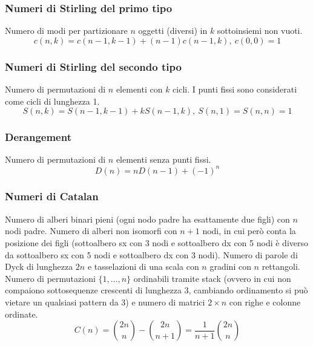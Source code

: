 \subsubsection{Numeri di Stirling del primo tipo}
Numero di modi per partizionare $n$ oggetti (diversi) in $k$ sottoinsiemi non vuoti.
$$ c(n,k) = c(n-1,k-1) + (n-1) c(n-1,k),\ c(0,0) = 1 $$

\subsubsection{Numeri di Stirling del secondo tipo}
Numero di permutazioni di $n$ elementi con $k$ cicli. I punti fissi sono considerati come cicli di lunghezza 1.
$$ S(n,k) = S(n-1,k-1) + k S(n-1,k),\ S(n,1) = S(n,n) = 1 $$

\subsubsection{Derangement}
Numero di permutazioni di $n$ elementi senza punti fissi.
$$ D(n)=nD(n-1)+(-1)^n $$

\subsubsection{Numeri di Catalan}
Numero di alberi binari pieni (ogni nodo padre ha esattamente due figli) con $n$ nodi padre.
Numero di alberi non isomorfi con $n+1$ nodi, in cui però conta la posizione dei figli (sottoalbero sx con 3 nodi e sottoalbero dx con 5 nodi è diverso da sottoalbero sx con 5 nodi e sottoalbero dx con 3 nodi).
Numero di parole di Dyck di lunghezza $2n$ e tasselazioni di una scala con $n$ gradini con $n$ rettangoli.
Numero di permutazioni $\{1,\dots,n\}$ ordinabili tramite stack (ovvero in cui non compaiono sottosequenze crescenti di lunghezza 3, cambiando ordinamento si può vietare un qualsiasi pattern da 3) e numero di matrici $2\times n$ con righe e colonne ordinate.
$$ C(n)=\binom{2n}{n}-\binom{2n}{n+1}=\frac{1}{n+1}\binom{2n}{n} $$
